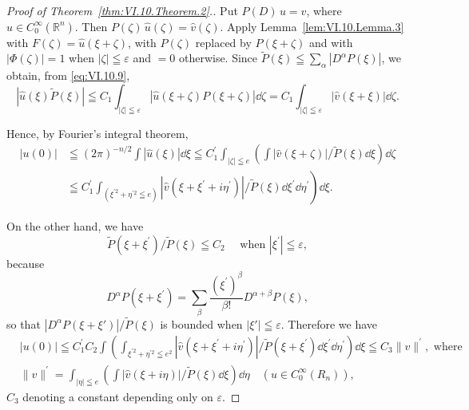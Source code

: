 \begin{proof}[Proof of Theorem~\ref{thm:VI.10.Theorem.2}.]
Put $P(D) \, u = v$, where $u \in C_0^\infty(\mathbb{R}^{n})$. Then $P(\zeta) \, \hat{u}(\zeta) = \hat{v}(\zeta)$. Apply Lemma~\ref{lem:VI.10.Lemma.3} with $F(\zeta) = \hat{u}(\xi + \zeta)$, with $P(\zeta)$ replaced by $P(\xi + \zeta)$ and with $|\Phi(\zeta)| = 1$ when $|\zeta| \leqq \varepsilon$ and $= 0$ otherwise. Since $\tilde{P}(\xi) \leqq \sum\limits_{\alpha} |D^\alpha P(\xi)|$, we obtain, from \eqref{eq:VI.10.9},
\[
\left| \hat {u} (\xi) \tilde {P} (\xi) \right| \leqq C _{1} \int_{| \zeta | \leqq \varepsilon} \left| \hat {u} (\xi + \zeta) P (\xi + \zeta) \right| \dd \zeta = C _{1} \int_{| \zeta | \leqq \varepsilon} \left| \hat {v} (\xi + \xi) \right| \dd \zeta .
\]

Hence, by Fourier's integral theorem, 
\[
\begin{aligned}
\left| u (0) \right|& \leqq (2 \pi) ^{-n/2} \int | \hat {u} (\xi) | \dd \xi \leqq C _{1} ^{\prime} \int_{| \zeta | \leqq e} \left(\int | \hat {v} (\xi + \zeta) | / \tilde {P} (\xi) \dd \xi\right) \dd \zeta
\\
\quad& \leqq C _{1} ^{\prime} \int_ {\left(\xi^{\prime 2} + \eta^{\prime 2} \leqq e\right)} | \hat {v} (\xi + \xi^{\prime} + i \eta^{\prime}) | / \tilde {P} (\xi) \dd \xi^{\prime} \dd \eta^{\prime}\left. \right) \dd \xi .
\end{aligned}
\]

On the other hand, we have 
\[
\tilde {P} (\xi + \xi^{\prime}) / \tilde {P} (\xi) \leqq C _{2} \quad \text{ when } | \xi^{\prime} | \leqq \varepsilon ,
\]
because 
\[
D ^{\alpha} P (\xi + \xi^{\prime}) = \sum\limits_{\beta} \frac {(\xi^{\prime}) ^{\beta}}{\beta !} D ^{\alpha + \beta} P (\xi),
\]
so that $|D^{\alpha}P(\xi + \xi')| / \tilde{P}(\xi)$ is bounded when $|\xi'| \leqq \varepsilon$. Therefore we have 
\begin{equation}\label{eq:VI.10.11}
\begin{aligned}
&\left| u (0) \right| \leqq C _{1} ^{\prime} C _{2} \int \left(\int_ {\xi^{\prime 2} + \eta^{\prime 2} \leqq e ^{2}} \left| \hat {v} (\xi + \xi^{\prime} + i \eta^{\prime}) \right| / \tilde {P} (\xi + \xi^{\prime}) \dd \xi^{\prime} \dd \eta^{\prime}\right) \dd \xi \leqq C _{3} \| v \| ^{\prime}, \text{ where }
\\
&\| v \| ^{\prime} = \int_{| \eta | \leqq e} \left(\int | \hat {v} (\xi + i \eta) | / \tilde {P} (\xi) \dd \xi\right) \dd \eta \quad (u \in C _{0} ^{\infty} (R _{n})),
\end{aligned}
\end{equation}
$C_{3}$ denoting a constant depending only on $\varepsilon$. 


\end{proof}
